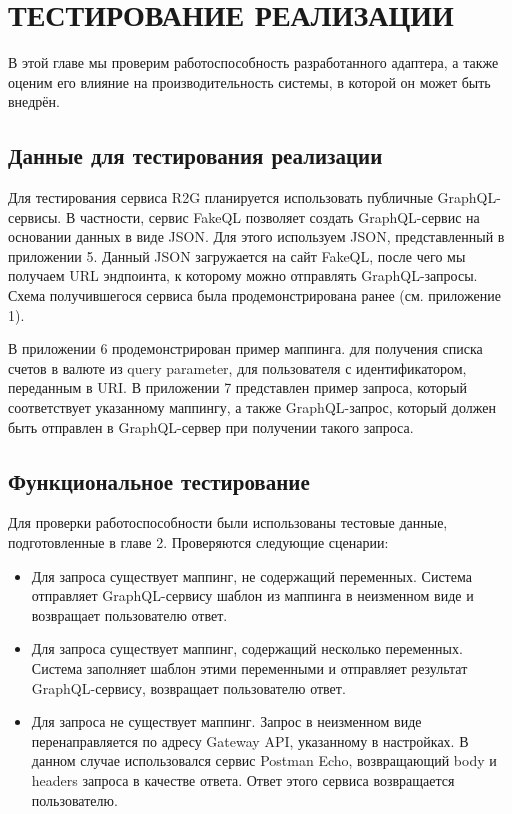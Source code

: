 \chapter{ТЕСТИРОВАНИЕ РЕАЛИЗАЦИИ} \label{ch:ch4}

В этой главе мы проверим работоспособность разработанного адаптера, а также оценим его влияние на производительность системы, в которой он может быть внедрён.

\section{Данные для тестирования реализации}\label{sec:ch4-testing-data}

Для тестирования сервиса R2G планируется использовать публичные GraphQL-сервисы.
В частности, сервис FakeQL позволяет создать GraphQL-сервис на основании данных в виде JSON. Для этого используем JSON, представленный в приложении 5.
Данный JSON загружается на сайт FakeQL, после чего мы получаем URL эндпоинта, к которому можно отправлять GraphQL-запросы.
Схема получившегося сервиса была продемонстрирована ранее (см. приложение 1).

В приложении 6 продемонстрирован пример маппинга. %
для получения списка счетов в валюте из query parameter, для пользователя с идентификатором, переданным в URI. В приложении 7 представлен пример запроса, который соответствует указанному маппингу, а также GraphQL-запрос, который должен быть отправлен в GraphQL-сервер при получении такого запроса.

\section{Функциональное тестирование} \label{sec:ch4-functional}

	Для проверки работоспособности были использованы тестовые данные, подготовленные в главе 2.
	Проверяются следующие сценарии:

\begin{itemize}
	\item Для запроса существует маппинг, не содержащий переменных.
	Система отправляет GraphQL-сервису шаблон из маппинга в неизменном виде и возвращает пользователю ответ.

	\item Для запроса существует маппинг, содержащий несколько переменных.
	Система заполняет шаблон этими переменными и отправляет результат GraphQL-сервису, возвращает пользователю ответ.

    \item Для запроса не существует маппинг.
	Запрос в неизменном виде перенаправляется по адресу Gateway API, указанному в настройках.
	В данном случае использовался сервис Postman Echo, возвращающий body и headers запроса в качестве ответа.
	Ответ этого сервиса возвращается пользователю.
\end{itemize}

